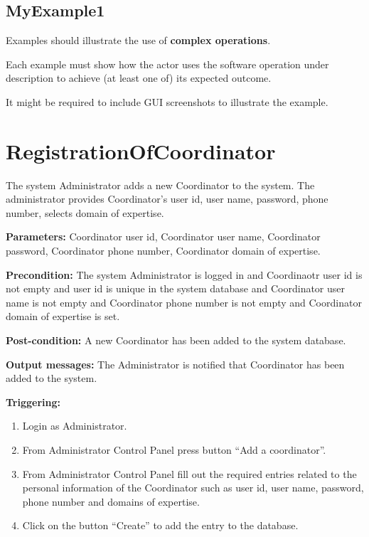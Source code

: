  
\subsection{MyExample1}
Examples should illustrate the use of \textbf{complex operations}.

Each example must show how the actor uses the software operation under
description to achieve (at least one of) its expected outcome.

It might be required to include GUI screenshots to illustrate the example.



\section{RegistrationOfCoordinator}
\label{operation:RegistrationOfCoordinator}
The system Administrator adds a new Coordinator to the system. The administrator 
provides Coordinator's user id, user name, password, phone number, selects
domain of expertise.

\begin{description}

\item \textbf{Parameters:} Coordinator user id, Coordinator user name,
Coordinator password, Coordinator phone number, Coordinator domain of expertise.
\item \textbf{Precondition:} The system Administrator is logged in and
Coordinaotr user id is not empty and user id is unique in the system database
and Coordinator user name is not empty and Coordinator phone number is not empty and Coordinator domain of expertise is
set.
\item \textbf{Post-condition:} A new Coordinator has been added to the system
database.
\item \textbf{Output messages:} The Administrator is notified that Coordinator
has been added to the system.

\item \textbf{Triggering:}
\begin{enumerate}
\item Login as Administrator.
\item From Administrator Control Panel press button ``Add a coordinator''.
\item From Administrator Control Panel fill out the required entries related to
the personal information of the Coordinator such as user id, user name,
password, phone number and domains of expertise.
\item Click on the button ``Create'' to add the entry to the database.
\end{enumerate}
 
\end{description}


